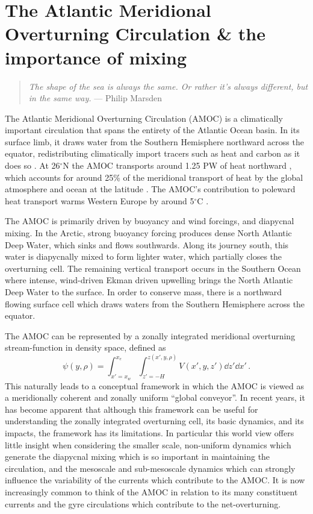 \chapter{The Atlantic Meridional Overturning Circulation \& the importance of mixing}
\begin{quote}
\textit{The shape of the sea is always the same. Or rather it's always different, but in the same way.} --- Philip Marsden
\end{quote}

The Atlantic Meridional Overturning Circulation (AMOC) is a climatically important circulation that spans the entirety of the Atlantic Ocean basin. In its surface limb, it draws water from the Southern Hemisphere northward across the equator, redistributing climatically import tracers such as heat and carbon as it does so \citep{Buckley2015}. At 26$^\circ$N the AMOC transports around 1.25 PW of heat northward \citep{Bryden2020}, which accounts for around 25\% of the meridional transport of heat by the global atmosphere and ocean at the latitude \citep{Srokosz2012}. The AMOC's contribution to poleward heat transport warms Western Europe by around 5$^\circ$C \citep{Jackson2015}.

The AMOC is primarily driven by buoyancy and wind forcings, and diapycnal mixing. In the Arctic, strong buoyancy forcing produces dense North Atlantic Deep Water, which sinks and flows southwards. Along its journey south, this water is diapycnally mixed to form lighter water, which partially closes the overturning cell. The remaining vertical transport occurs in the Southern Ocean where intense, wind-driven Ekman driven upwelling brings the North Atlantic Deep Water to the surface. In order to conserve mass, there is a northward flowing surface cell which draws waters from the Southern Hemisphere across the equator.

The AMOC can be represented by a zonally integrated meridional overturning stream-function in density space, defined as
\begin{equation}
    \psi(y, \rho) = \int_{x' = x_w}^{x_e} \int_{z' = -H}^{z(x', y, \rho)} V(x', y, z') \dd{z'} \dd{x'} \,.
\end{equation}
This naturally leads to a conceptual framework in which the AMOC is viewed as a meridionally coherent and zonally uniform ``global conveyor''. In recent years, it has become apparent that although this framework can be useful for understanding the zonally integrated overturning cell, its basic dynamics, and its impacts, the framework has its limitations. In particular this world view offers little insight when considering the smaller scale, non-uniform dynamics which generate the diapycnal mixing which is so important in maintaining the circulation, and the mesoscale and sub-mesoscale dynamics which can strongly influence the variability of the currents which contribute to the AMOC. It is now increasingly common to think of the AMOC in relation to its many constituent currents and the gyre circulations which contribute to the net-overturning.

